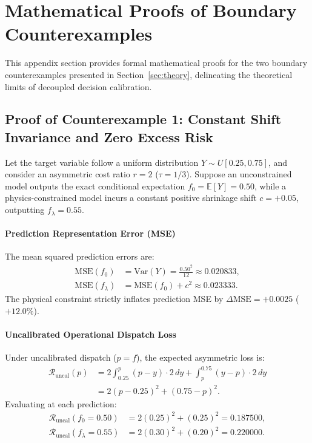 \section{Mathematical Proofs of Boundary Counterexamples}
\label{sec:appendix_proofs}

This appendix section provides formal mathematical proofs for the two boundary counterexamples presented in Section~\ref{sec:theory}, delineating the theoretical limits of decoupled decision calibration.

\subsection{Proof of Counterexample 1: Constant Shift Invariance and Zero Excess Risk}
\label{subsec:counterexample1}

\begin{example}
\label{ex:constant_shift}
Let the target variable follow a uniform distribution $Y \sim U[0.25, 0.75]$, and consider an asymmetric cost ratio $r = 2$ ($\tau = 1/3$). Suppose an unconstrained model outputs the exact conditional expectation $f_0 = \mathbb{E}[Y] = 0.50$, while a physics-constrained model incurs a constant positive shrinkage shift $c = +0.05$, outputting $f_\lambda = 0.55$.
\end{example}

\paragraph{Prediction Representation Error (MSE)}
The mean squared prediction errors are:
\begin{align}
\text{MSE}(f_0) &= \text{Var}(Y) = \frac{0.50^2}{12} \approx 0.020833, \\
\text{MSE}(f_\lambda) &= \text{MSE}(f_0) + c^2 \approx 0.023333.
\end{align}
The physical constraint strictly inflates prediction MSE by $\Delta \text{MSE} = +0.0025$ ($+12.0\%$).

\paragraph{Uncalibrated Operational Dispatch Loss}
Under uncalibrated dispatch ($p = f$), the expected asymmetric loss is:
\begin{equation}
\begin{aligned}
\mathcal{R}_{\text{uncal}}(p) &= 2 \int_{0.25}^p (p - y) \cdot 2 \, dy + \int_p^{0.75} (y - p) \cdot 2 \, dy \\
&= 2(p - 0.25)^2 + (0.75 - p)^2.
\end{aligned}
\end{equation}
Evaluating at each prediction:
\begin{align}
\mathcal{R}_{\text{uncal}}(f_0 = 0.50) &= 2(0.25)^2 + (0.25)^2 = 0.187500, \\
\mathcal{R}_{\text{uncal}}(f_\lambda = 0.55) &= 2(0.30)^2 + (0.20)^2 = 0.220000.
\end{align}

